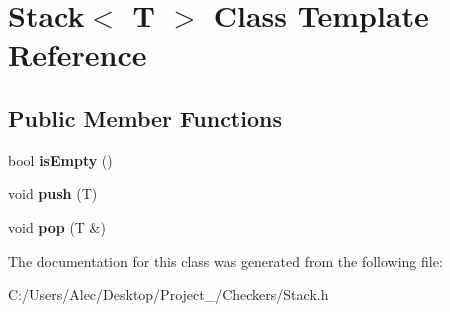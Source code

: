 \hypertarget{class_stack}{\section{Stack$<$ T $>$ Class Template Reference}
\label{class_stack}
}
\subsection*{Public Member Functions}
\begin{DoxyCompactItemize}
\item 
\hypertarget{class_stack_ad0db0d9b249e871bb7504ed89a99d3a7}{bool {\bfseries is\-Empty} ()}\label{class_stack_ad0db0d9b249e871bb7504ed89a99d3a7}

\item 
\hypertarget{class_stack_a23b04908bc297e161d12aa75f5382bfd}{void {\bfseries push} (T)}\label{class_stack_a23b04908bc297e161d12aa75f5382bfd}

\item 
\hypertarget{class_stack_aed15c5e2145d9a9f8d5eddbed8b24b86}{void {\bfseries pop} (T \&)}\label{class_stack_aed15c5e2145d9a9f8d5eddbed8b24b86}

\end{DoxyCompactItemize}


The documentation for this class was generated from the following file\-:\begin{DoxyCompactItemize}
\item 
C\-:/\-Users/\-Alec/\-Desktop/\-Project\-\_/\-Checkers/Stack.\-h\end{DoxyCompactItemize}

